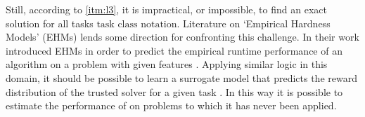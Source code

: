         Still, according to \ref{itm:l3}, it is impractical, or impossible, to find an exact solution for all tasks $\text{task class notation}$. Literature on `Empirical Hardness Models' (EHMs) lends some direction for confronting this challenge. In their work \cite{Leyton-Brown2009-yr,Hutter2009-og} introduced EHMs in order to predict the empirical runtime performance of an algorithm on a problem with given features . Applying similar logic in this domain, it should be possible to learn a surrogate model \surrogate{} that predicts the reward distribution \rwdstarapprox{} of the trusted solver \solvestar{} for a given task \task. In this way it is possible to estimate the performance of \solvestar{} on problems to which it has never been applied.
